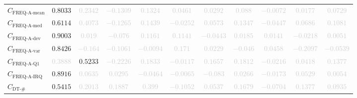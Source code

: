 \documentclass{standalone}
\newcommand{\actfreqmeanname}{\text{FREQ-A-mean}}
\newcommand{\actfreqmean}{C_{\actfreqmeanname}}
\newcommand{\actfreqmedianname}{\text{FREQ-A-med}}
\newcommand{\actfreqmedian}{C_{\actfreqmedianname}}
\newcommand{\actfreqdevname}{\text{FREQ-A-dev}}
\newcommand{\actfreqdev}{C_{\actfreqdevname}}
\newcommand{\actfreqvarname}{\text{FREQ-A-var}}
\newcommand{\actfreqvar}{C_{\actfreqvarname}}
\newcommand{\actfreqqonename}{\text{FREQ-A-Q1}}
\newcommand{\actfreqqone}{C_{\actfreqqonename}}
\newcommand{\actfreqiqrname}{\text{FREQ-A-IRQ}}
\newcommand{\actfreqiqr}{C_{\actfreqiqrname}}
\newcommand{\numberuniquetracesname}{\text{DT-\#}}
\newcommand{\numberuniquetraces}{C_{\numberuniquetracesname}}
\begin{document}
\begin{tabular}{lcccccccccc}
$\actfreqmean$ & $0.8033$ & \textcolor{lightgray}{$0.2342$} & \textcolor{lightgray}{$-0.1309$} & \textcolor{lightgray}{$0.1324$} & \textcolor{lightgray}{$0.0461$} & \textcolor{lightgray}{$0.0292$} & \textcolor{lightgray}{$0.088$} & \textcolor{lightgray}{$-0.0072$} & \textcolor{lightgray}{$0.0177$} & \textcolor{lightgray}{$0.0729$} \\ 
$\actfreqmedian$ & $0.6114$ & \textcolor{lightgray}{$0.4073$} & \textcolor{lightgray}{$-0.1265$} & \textcolor{lightgray}{$0.1439$} & \textcolor{lightgray}{$-0.0252$} & \textcolor{lightgray}{$0.0573$} & \textcolor{lightgray}{$0.1347$} & \textcolor{lightgray}{$-0.0447$} & \textcolor{lightgray}{$0.0686$} & \textcolor{lightgray}{$0.1081$} \\ 
$\actfreqdev$ & $0.9003$ & \textcolor{lightgray}{$0.019$} & \textcolor{lightgray}{$-0.076$} & \textcolor{lightgray}{$0.1161$} & \textcolor{lightgray}{$0.1141$} & \textcolor{lightgray}{$-0.0443$} & \textcolor{lightgray}{$0.0185$} & \textcolor{lightgray}{$0.0141$} & \textcolor{lightgray}{$-0.0218$} & \textcolor{lightgray}{$0.0051$} \\ 
$\actfreqvar$ & $0.8426$ & \textcolor{lightgray}{$-0.164$} & \textcolor{lightgray}{$-0.1061$} & \textcolor{lightgray}{$-0.0094$} & \textcolor{lightgray}{$0.171$} & \textcolor{lightgray}{$0.0229$} & \textcolor{lightgray}{$-0.046$} & \textcolor{lightgray}{$0.0458$} & \textcolor{lightgray}{$-0.2097$} & \textcolor{lightgray}{$-0.0539$} \\ 
$\actfreqqone$ & \textcolor{lightgray}{$0.3888$} & $0.5233$ & \textcolor{lightgray}{$-0.2226$} & \textcolor{lightgray}{$0.1833$} & \textcolor{lightgray}{$-0.0117$} & \textcolor{lightgray}{$0.1657$} & \textcolor{lightgray}{$0.1812$} & \textcolor{lightgray}{$-0.0216$} & \textcolor{lightgray}{$0.0418$} & \textcolor{lightgray}{$0.1377$} \\ 
$\actfreqiqr$ & $0.8916$ & \textcolor{lightgray}{$0.0635$} & \textcolor{lightgray}{$0.0295$} & \textcolor{lightgray}{$-0.0464$} & \textcolor{lightgray}{$-0.0065$} & \textcolor{lightgray}{$-0.083$} & \textcolor{lightgray}{$0.0266$} & \textcolor{lightgray}{$-0.0173$} & \textcolor{lightgray}{$0.0529$} & \textcolor{lightgray}{$0.0054$} \\ 
$\numberuniquetraces$ & $0.5415$ & \textcolor{lightgray}{$0.2013$} & \textcolor{lightgray}{$0.1887$} & \textcolor{lightgray}{$0.399$} & \textcolor{lightgray}{$-0.1052$} & \textcolor{lightgray}{$0.0537$} & \textcolor{lightgray}{$0.1679$} & \textcolor{lightgray}{$-0.0704$} & \textcolor{lightgray}{$0.1377$} & \textcolor{lightgray}{$0.0935$} \\ 

\end{tabular}
\end{document}
